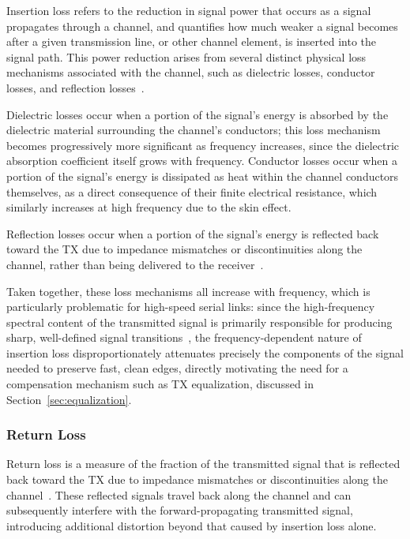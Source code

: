 Insertion loss refers to the reduction in signal power that occurs as a signal propagates through a channel, and quantifies how much weaker a signal becomes after a given transmission line, or other channel element, is inserted into the signal path. This power reduction arises from several distinct physical loss mechanisms associated with the channel, such as dielectric losses, conductor losses, and reflection losses~\cite{bogatin_SI}.


Dielectric losses occur when a portion of the signal's energy is absorbed by the dielectric material surrounding the channel's conductors; this loss mechanism becomes progressively more significant as frequency increases, since the dielectric absorption coefficient itself grows with frequency. Conductor losses occur when a portion of the signal's energy is dissipated as heat within the channel conductors themselves, as a direct consequence of their finite electrical resistance, which similarly increases at high frequency due to the skin effect\cite{zamir2018_nrz_pam4}. 


Reflection losses occur when a portion of the signal's energy is reflected back toward the \ac{TX} due to impedance mismatches or discontinuities along the channel, rather than being delivered to the receiver~\cite{bogatin_SI}.

Taken together, these loss mechanisms all increase with frequency, which is particularly problematic for high-speed serial links: since the high-frequency spectral content of the transmitted signal is primarily responsible for producing sharp, well-defined signal transitions~\cite{razavi_NRZ_PAM4,zamir2018_nrz_pam4}, the frequency-dependent nature of insertion loss disproportionately attenuates precisely the components of the signal needed to preserve fast, clean edges, directly motivating the need for a compensation mechanism such as \ac{TX} equalization, discussed in Section~\ref{sec:equalization}.

\subsubsection{Return Loss}\label{sec:return_loss}

Return loss is a measure of the fraction of the transmitted signal that is reflected back toward the \ac{TX} due to impedance mismatches or discontinuities along the channel~\cite{bogatin_SI}. These reflected signals travel back along the channel and can subsequently interfere with the forward-propagating transmitted signal, introducing additional distortion beyond that caused by insertion loss alone.

